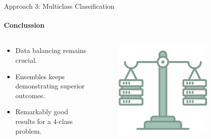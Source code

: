 \documentclass[9pt, pstricks, xcolor=dvipsnames]{beamer}
\begin{document}
\begin{frame}{Approach 3: Multiclass Classification}
	\framesubtitle{Conclussion}
	\begin{columns}
		\begin{column}{0.5\textwidth}
			\begin{itemize}
				\item Data balancing remains crucial.
				\item Ensembles keeps demonstrating superior outcomes.
				\item Remarkably good results for a 4-class problem.
			\end{itemize}
		\end{column}
		\begin{column}{0.5\textwidth}
			\begin{figure}
				\centering
				\includegraphics[width=0.8\textwidth]{images/load-balancer.png}
			\end{figure}
		\end{column}

	\end{columns}
\end{frame}
\end{document}
